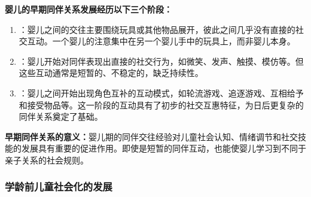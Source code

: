 \begin{keybox}
\textbf{婴儿的早期同伴关系发展经历以下三个阶段：}

\begin{enumerate}[leftmargin=*]
    \item {}：婴儿之间的交往主要围绕玩具或其他物品展开，彼此之间几乎没有直接的社交互动。一个婴儿的注意集中在另一个婴儿手中的玩具上，而非婴儿本身。

    \item {}：婴儿开始对同伴表现出直接的社交行为，如微笑、发声、触摸、模仿等。但这些互动通常是短暂的、不稳定的，缺乏持续性。

    \item {}：婴儿之间开始出现角色互补的互动模式，如轮流游戏、追逐游戏、互相给予和接受物品等。这一阶段的互动具有了初步的社交互惠特征，为日后更复杂的同伴关系奠定了基础。
\end{enumerate}

\textbf{早期同伴关系的意义：}婴儿期的同伴交往经验对儿童社会认知、情绪调节和社交技能的发展具有重要的促进作用。即使是短暂的同伴互动，也能使婴儿学习到不同于亲子关系的社会规则。
\end{keybox}

\subsubsection{学龄前儿童社会化的发展}

